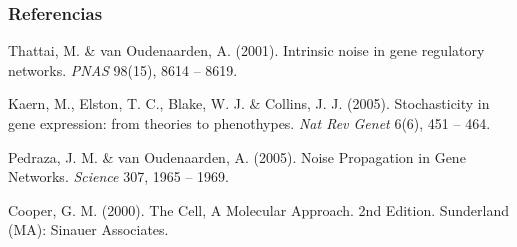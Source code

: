 \documentclass{beamer}
\begin{document}
\begin{frame}
\frametitle{Referencias}
\footnotesize{
\begin{thebibliography}{99}

 Thattai, M. \& van Oudenaarden, A. (2001).
\newblock Intrinsic noise in gene regulatory networks.
\newblock \emph{PNAS} 98(15), 8614 -- 8619.

 Kaern, M., Elston, T. C., Blake, W. J. \& Collins, J. J. (2005).
\newblock Stochasticity in gene expression: from theories to phenothypes.
\newblock \emph{Nat Rev Genet} 6(6), 451 -- 464.

 Pedraza, J. M. \& van Oudenaarden, A. (2005).
\newblock Noise Propagation in Gene Networks.
\newblock \emph{Science} 307, 1965 -- 1969.

 Cooper, G. M. (2000).
\newblock The Cell, A Molecular Approach. 2nd Edition.
\newblock Sunderland (MA): Sinauer Associates.
\end{thebibliography}
}
\end{frame}
\end{document}
